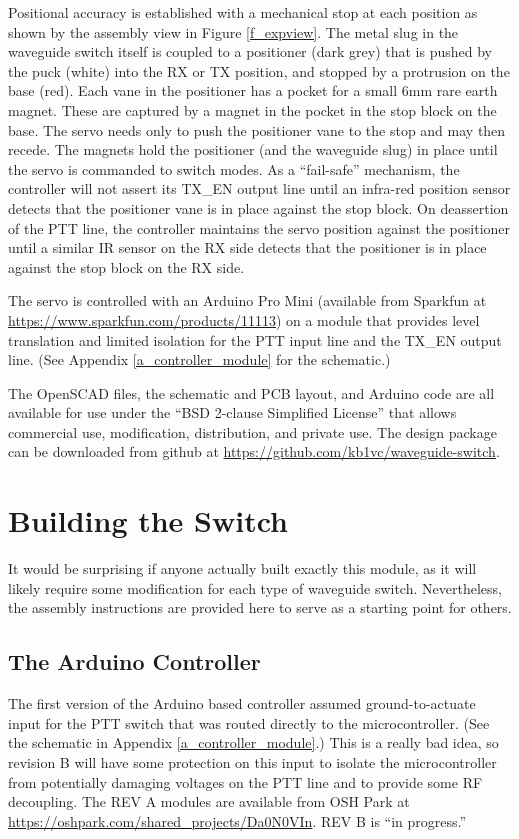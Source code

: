 \documentclass[12pt]{article}
\begin{document}
Positional accuracy is established with a mechanical stop at each
position as shown by the assembly view in Figure \ref{f_expview}. The
metal slug in the waveguide switch itself is coupled to a positioner
(dark grey) that is pushed by the puck (white) into the RX or TX
position, and stopped by a protrusion on the base (red). Each vane in
the positioner has a pocket for a small 6mm rare earth magnet. These
are captured by a magnet in the pocket in the stop block on the
base. The servo needs only to push the positioner vane to the stop and
may then recede. The magnets hold the positioner (and the waveguide
slug) in place until the servo is commanded to switch modes.  As a
``fail-safe'' mechanism, the controller will not assert its TX\_EN
output line until an infra-red position sensor detects that the
positioner vane is in place against the stop block.  On deassertion of
the PTT line, the controller maintains the servo position against the
positioner until a similar IR sensor on the RX side detects that the
positioner is in place against the stop block on the RX side.

The servo is controlled with an Arduino Pro Mini (available from
Sparkfun at \url{https://www.sparkfun.com/products/11113}) on a module
that provides level translation and limited isolation for the PTT
input line and the TX\_EN output line. (See Appendix \ref{a_controller_module}
for the schematic.)

The OpenSCAD files, the schematic and PCB layout, and Arduino code are
all available for use under the ``BSD 2-clause Simplified License'' that
allows commercial use, modification, distribution, and private use.
The design package can be downloaded from github at \url{https://github.com/kb1vc/waveguide-switch}.

\section{Building the Switch}

It would be surprising if anyone actually built exactly this module,
as it will likely require some modification for each type of waveguide
switch.  Nevertheless, the assembly instructions are provided here to
serve as a starting point for others.

\subsection{The Arduino Controller}

The first version of the Arduino based controller assumed ground-to-actuate
input for the PTT switch that was routed directly to the microcontroller.
(See the schematic in Appendix \ref{a_controller_module}.)
This is a really bad idea, so revision B will have some protection on this
input to isolate the microcontroller from potentially damaging voltages on the
PTT line and to provide some RF decoupling.
The REV A modules are available from OSH Park at \url{https://oshpark.com/shared_projects/Da0N0VIn}.
REV B is ``in progress.''
\end{document}
